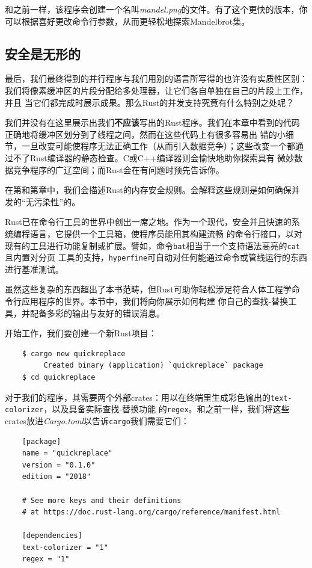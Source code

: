 \medskip
和之前一样，该程序会创建一个名叫\textit{mandel.png}的文件。有了这个更快的版本，你可以根据喜好更改命令行参数，从而更轻松地探索Mandelbrot集。

\medskip
\subsection{安全是无形的}
最后，我们最终得到的并行程序与我们用别的语言所写得的也许没有实质性区别：我们将像素缓冲区的片段分配给多处理器，让它们各自单独在自己的片段上工作，并且
当它们都完成时展示成果。那么Rust的并发支持究竟有什么特别之处呢？

\medskip
我们并没有在这里展示出我们{\bfseries{不应该}}写出的Rust程序。我们在本章中看到的代码正确地将缓冲区划分到了线程之间，然而在这些代码上有很多容易出
错的小细节，一旦改变可能使程序无法正确工作（从而引入数据竞争）；这些改变一个都通过不了Rust编译器的静态检查。C或C++编译器则会愉快地助你探索具有
微妙数据竞争程序的广辽空间；而Rust会在有问题时预先告诉你。

\medskip
在第和第章中，我们会描述Rust的内存安全规则。会解释这些规则是如何确保并发的“无污染性”的。

\bigskip
{}
Rust已在命令行工具的世界中创出一席之地。作为一个现代，安全并且快速的系统编程语言，它提供一个工具箱，使程序员能用其构建流畅
的命令行接口，以对现有的工具进行功能复制或扩展。譬如，命令\texttt{bat}相当于一个支持语法高亮的\texttt{cat}且内置对分页
工具的支持，\texttt{hyperfine}可自动对任何能通过命令或管线运行的东西进行基准测试。

\medskip
虽然这些复杂的东西超出了本书范畴，但Rust可助你轻松涉足符合人体工程学命令行应用程序的世界。本节中，我们将向你展示如何构建
你自己的查找-替换工具，并配备多彩的输出与友好的错误消息。

\medskip
开始工作，我们要创建一个新Rust项目：
\begin{verbatim}
    $ cargo new quickreplace
         Created binary (application) `quickreplace` package
    $ cd quickreplace
\end{verbatim}

\smallskip
对于我们的程序，其需要两个外部crates：用以在终端里生成彩色输出的\texttt{text-colorizer}，以及具备实际查找-替换功能
的\texttt{regex}。和之前一样，我们将这些crates放进\textit{Cargo.toml}以告诉\texttt{cargo}我们需要它们：
\begin{verbatim}
    [package]
    name = "quickreplace"
    version = "0.1.0"
    edition = "2018"

    # See more keys and their definitions 
    # at https://doc.rust-lang.org/cargo/reference/manifest.html

    [dependencies]
    text-colorizer = "1"
    regex = "1"
\end{verbatim}

